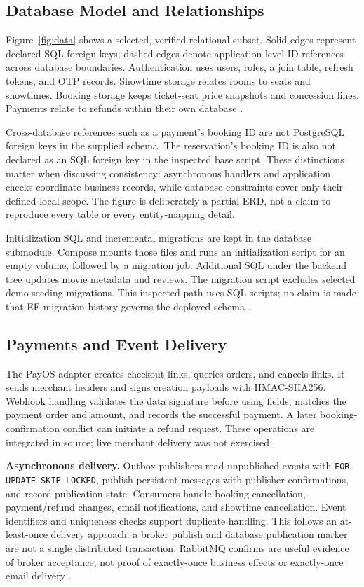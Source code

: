 \documentclass[conference]{IEEEtran}
\newcommand{\code}[1]{\texttt{#1}}
\begin{document}
\subsection{Database Model and Relationships}
Figure~\ref{fig:data} shows a selected, verified relational subset. Solid edges
represent declared SQL foreign keys; dashed edges denote application-level ID
references across database boundaries. Authentication uses users, roles, a join
table, refresh tokens, and OTP records. Showtime storage relates rooms to seats
and showtimes. Booking storage keeps ticket-seat price snapshots and
concession lines. Payments relate to refunds within their own database
\cite{db,booking}.


Cross-database references such as a payment's booking ID are not PostgreSQL
foreign keys in the supplied schema. The reservation's booking ID is also not
declared as an SQL foreign key in the inspected base script. These distinctions
matter when discussing consistency: asynchronous handlers and application checks
coordinate business records, while database constraints cover only their
defined local scope. The figure is deliberately a partial ERD, not a claim to
reproduce every table or every entity-mapping detail.

Initialization SQL and incremental migrations are kept in the database
submodule. Compose mounts those files and runs an initialization script for
an empty volume, followed by a migration job. Additional SQL under the backend
tree updates movie metadata and reviews. The migration script excludes selected
demo-seeding migrations. This inspected path uses SQL scripts; no claim is made
that EF migration history governs the deployed schema \cite{deployment,db}.

\subsection{Payments and Event Delivery}
The PayOS adapter creates checkout links, queries orders, and cancels links.
It sends merchant headers and signs creation payloads with HMAC-SHA256.
Webhook handling validates the data signature before using fields, matches
the payment order and amount, and records the successful payment. A later
booking-confirmation conflict can initiate a refund request. These operations
are integrated in source; live merchant delivery was not exercised
\cite{booking,payos}.

\textbf{Asynchronous delivery.} Outbox publishers read unpublished events with \code{FOR UPDATE SKIP LOCKED},
publish persistent messages with publisher confirmations, and record publication
state. Consumers handle booking cancellation, payment/refund changes, email
notifications, and showtime cancellation. Event identifiers and uniqueness checks
support duplicate handling. This follows an at-least-once delivery approach:
a broker publish and database publication marker are not a single distributed
transaction. RabbitMQ confirms are useful evidence of broker acceptance, not
proof of exactly-once business effects or exactly-once email delivery
\cite{booking,rabbit}.
\end{document}
